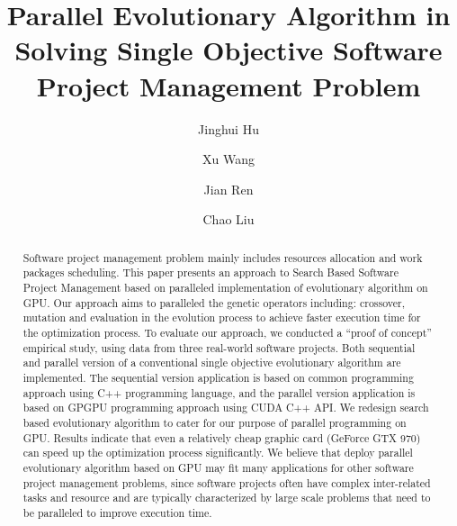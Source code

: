 %
\title{Parallel Evolutionary Algorithm in Solving Single Objective Software Project Management Problem}
%
%
\author{ Jinghui Hu \and Xu Wang \and Jian Ren \and Chao Liu}
%
%
%

\maketitle

\begin{abstract}
Software project management problem mainly includes resources allocation and work packages scheduling.
This paper presents an approach to Search Based Software Project Management based on paralleled implementation of evolutionary algorithm on GPU. 
Our approach aims to paralleled the genetic operators including: crossover, mutation and evaluation in the evolution process to achieve faster execution time for the optimization process.
To evaluate our approach, we conducted a ``proof of concept'' empirical study, using data from three real-world software projects. 
Both sequential and parallel version of a conventional single objective evolutionary algorithm are implemented. 
The sequential version application is based on common programming approach using C++ programming language, and the parallel version application is based on GPGPU programming approach using CUDA C++ API.
We redesign search based evolutionary algorithm to cater for our purpose of parallel programming on GPU.
Results indicate that even a relatively cheap graphic card (GeForce GTX 970) can speed up the optimization process significantly.
We believe that deploy parallel evolutionary algorithm based on GPU  may fit many applications for other software project management problems, since software projects often have complex inter-related tasks and resource and are typically characterized by large scale problems that need to be paralleled to improve execution time.


\end{abstract}
